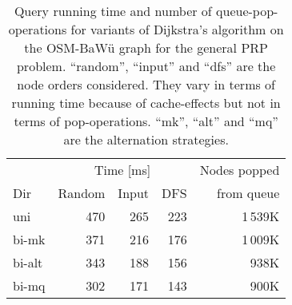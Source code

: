 \documentclass{sig-alternate}
\begin{document}
\begin{table}
\caption{\label{tab:dij-tuning}Query running time and number of queue-pop-operations for variants of Dijkstra's algorithm on the OSM-BaWü graph for the general PRP problem.
``random'', ``input'' and ``dfs'' are the node orders considered.
They vary in terms of running time because of cache-effects but not
in terms of pop-operations. ``mk'', ``alt'' and ``mq'' are the
alternation strategies. }
\begin{centering}
\begin{tabular}{lrrrr}
\toprule
 & \multicolumn{3}{c}{Time {[}ms{]}} & Nodes popped\tabularnewline
Dir & Random & Input & DFS & from queue\tabularnewline
\midrule 
uni & 470 & 265 & 223 & 1\,539K\tabularnewline
bi-mk & 371 & 216 & 176 & 1\,009K\tabularnewline
bi-alt & 343 & 188 & 156 & 938K\tabularnewline
bi-mq & 302 & 171 & 143 & 900K\tabularnewline
\bottomrule
\end{tabular}
\par\end{centering}


\end{table}
\end{document}
